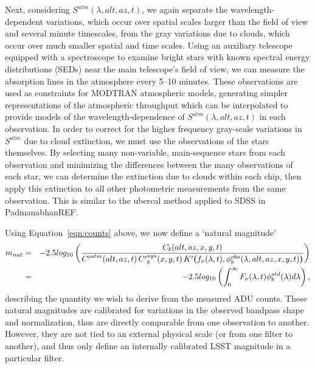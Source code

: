 \documentclass[12pt,preprint]{aastex}
\begin{document}
Next, considering $S^{atm}(\lambda,alt,az,t)$, we again separate the
wavelength-dependent variations, which occur over spatial scales
larger than the field of view and several minute timescales, from the
gray variations due to clouds, which occur over much smaller spatial
and time scales. Using an auxiliary telescope equipped with a
spectroscope to examine bright stars with known spectral energy
distributions (SEDs) near the main telescope's field of view, we can
measure the absorption lines in the atmosphere every 5--10
minutes. These observations are used as constraints for MODTRAN
atmospheric models, generating simpler representations of the
atmospheric throughput which can be interpolated to provide models of
the wavelength-dependence of $S^{atm}(\lambda,alt,az,t)$ in each
observation. In order to correct for the higher frequency gray-scale
variations in $S^{atm}$ due to cloud extinction, we must use the
observations of the stars themselves. By selecting many non-variable,
main-sequence stars from each observation and minimizing the
differences between the many observations of each star, we can
determine the extinction due to clouds within each chip, then apply
this extinction to all other photometric measurements from the same
observation. This is similar to the ubercal method applied to SDSS in
PadmanabhanREF.

Using Equation~\ref{eqn:counts} above, we now define a `natural magnitude'
\begin{eqnarray}
\label{eqn:defnatmags}
m_{nat}  & = &-2.5 log_{10} \left( {C_b(alt,az,x,y,t) \over 
{C'}^{atm}(alt,az,t) \, {C'}_b^{sys}(x,y,t) \,
K'{\textbf(}f_\nu(\lambda,t),
\phi_b^{obs}(\lambda,alt,az,x,y,t){\textbf)} } \right) \nonumber \\
 & = & -2.5 log_{10} \left( \int_0^\infty
   {F_\nu(\lambda,t)\phi_b^{std}(\lambda)  d\lambda} \right),
\end{eqnarray}
describing the quantity we wish to derive from the measured ADU
counts.  These natural magnitudes are calibrated for variations in the
observed bandpass shape and normalization, thus are directly
comparable from one observation to another. However, they are not tied
to an external physical scale (or from one filter to another), and
thus only define an internally calibrated LSST magnitude in a
particular filter.
\end{document}
